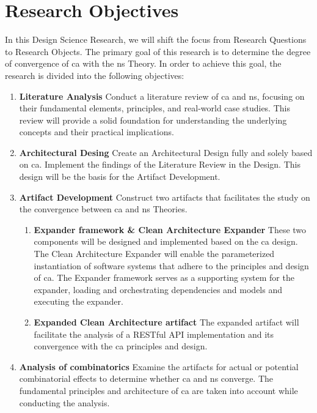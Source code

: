 \section{Research Objectives} \label{sec_research_objectives}

In this Design Science Research, we will shift the focus from Research Questions to
Research Objects. The primary goal of this research is to determine the degree of
convergence of \gls{ca} with the \gls{ns} Theory. In order to achieve this goal, the
research is divided into the following objectives:

\begin{enumerate}
    \item \textbf{Literature Analysis} \newline
    Conduct a literature review of \gls{ca} and \gls{ns}, focusing on their
    fundamental elements, principles, and real-world case studies. This review will
    provide a solid foundation for understanding the underlying concepts and their
    practical implications.
    
    \item \textbf{Architectural Desing} \newline
    Create an Architectural Design fully and solely based on \gls{ca}. Implement the
    findings of the Literature Review in the Design. This design will be the basis for
    the Artifact Development.

    \item \textbf{Artifact Development} \newline
    Construct two artifacts that facilitates the study on the convergence
    between \gls{ca} and \gls{ns} Theories.
    \begin{enumerate}[label*={\arabic*.}]
        
        \item \textbf{Expander framework \& Clean Architecture Expander} \newline        
        These two components will be designed and implemented  based on the \gls{ca}
        design. The Clean Architecture Expander will enable the parameterized
        instantiation of software systems that adhere to the principles and design of
        \gls{ca}. The Expander framework serves as a supporting system for the expander,
        loading and orchestrating dependencies and models and executing the expander.
        
        \item \textbf{Expanded Clean Architecture artifact} \newline
        The expanded artifact will facilitate the analysis of a RESTful API implementation
        and its convergence with the \gls{ca} principles and design.
        
    \end{enumerate}
    
    \item \textbf{Analysis of combinatorics} \newline
    Examine the artifacts for actual or potential combinatorial effects to determine
    whether \gls{ca} and \gls{ns} converge. The fundamental principles and architecture of
    \gls{ca} are taken into account while conducting the analysis.
\end{enumerate}
